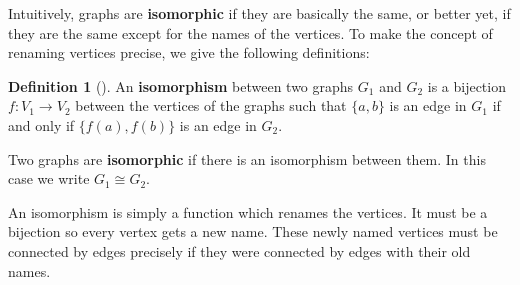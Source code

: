 \documentclass[10pt,]{book}
\newcommand{\terminology}[1]{\textbf{#1}}
\theoremstyle{plain}
\theoremstyle{definition}
\newtheorem{definition}[theorem]{Definition}
\theoremstyle{definition}
\theoremstyle{definition}
\numberwithin{equation}{chapter}
\def\isom{\cong}
\begin{document}
\hypertarget{p-51}{}%
Intuitively, graphs are \terminology{isomorphic}  if they are basically the same, or better yet, if they are the same except for the names of the vertices. To make the concept of renaming vertices precise, we give the following definitions:%
\begin{definition}[{}]\label{definition-2}
\hypertarget{p-52}{}%
 An \terminology{isomorphism} between two graphs \(G_1\) and \(G_2\) is a bijection \(f:V_1 \to V_2\) between the vertices of the graphs such that \(\{a,b\}\) is an edge in \(G_1\) if and only if \(\{f(a), f(b)\}\) is an edge in \(G_2\).%
\par
\hypertarget{p-53}{}%
Two graphs are \terminology{isomorphic} if there is an isomorphism between them. In this case we write \(G_1 \isom G_2\).%
\end{definition}
\hypertarget{p-54}{}%
An isomorphism is simply a function which renames the vertices. It must be a bijection so every vertex gets a new name. These newly named vertices must be connected by edges precisely if they were connected by edges with their old names.%
\end{document}
